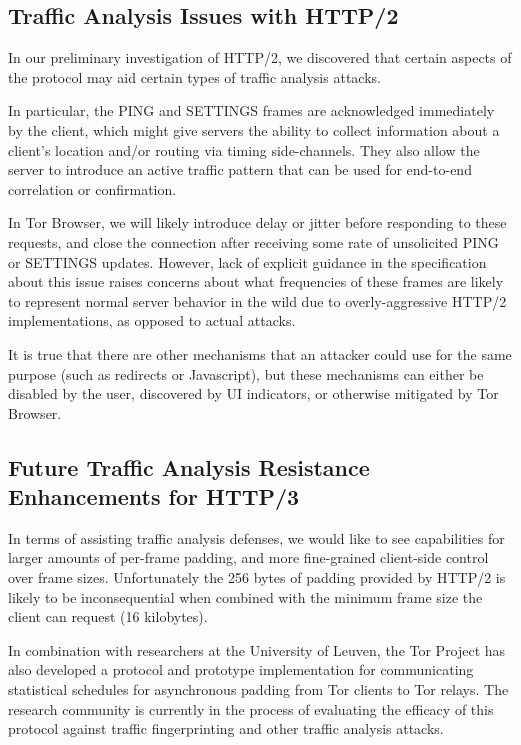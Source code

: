 \documentclass[letterpaper,11pt]{llncs}
\begin{document}
\subsection{Traffic Analysis Issues with HTTP/2}

In our preliminary investigation of HTTP/2, we discovered that certain aspects
of the protocol may aid certain types of traffic analysis attacks.

In particular, the PING and SETTINGS frames are acknowledged immediately by
the client, which might give servers the ability to collect information about a
client's location and/or routing via timing side-channels. They also allow the
server to introduce an active traffic pattern that can be used for end-to-end
correlation or confirmation.

In Tor Browser, we will likely introduce delay or jitter before responding to
these requests, and close the connection after receiving some rate of
unsolicited PING or SETTINGS updates. However, lack of explicit guidance in
the specification about this issue raises concerns about what frequencies of
these frames are likely to represent normal server behavior in the wild due to
overly-aggressive HTTP/2 implementations, as opposed to actual attacks.

It is true that there are other mechanisms that an attacker could use for the
same purpose (such as redirects or Javascript), but these mechanisms can
either be disabled by the user, discovered by UI indicators, or otherwise
mitigated by Tor Browser.

\subsection{Future Traffic Analysis Resistance Enhancements for HTTP/3}

In terms of assisting traffic analysis defenses, we would like to see
capabilities for larger amounts of per-frame padding, and more fine-grained
client-side control over frame sizes. Unfortunately the 256 bytes of padding
provided by HTTP/2 is likely to be inconsequential when combined with the
minimum frame size the client can request (16 kilobytes).

In combination with researchers at the University of Leuven, the Tor Project
has also developed a protocol and prototype implementation for communicating
statistical schedules for asynchronous padding from Tor clients to Tor relays.
The research community is currently in the process of evaluating the efficacy
of this protocol against traffic fingerprinting and other traffic analysis
attacks.
\end{document}
